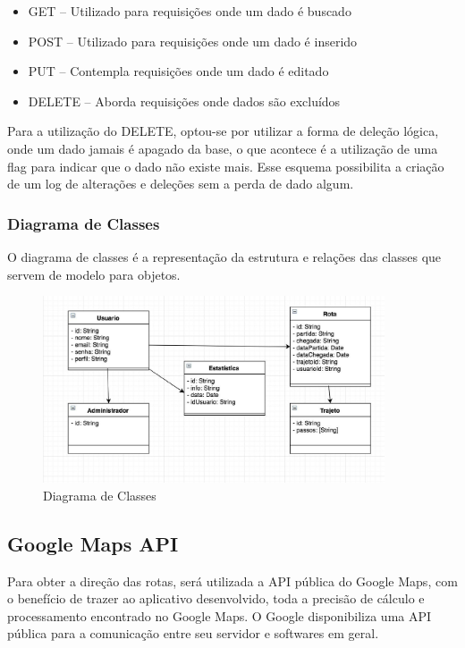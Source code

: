 \begin{itemize}
\item GET – Utilizado para requisições onde um dado é buscado
\item POST – Utilizado para requisições onde um dado é inserido
\item PUT – Contempla requisições onde um dado é editado
\item DELETE – Aborda requisições onde dados são excluídos

\end{itemize}
	
	Para a utilização do DELETE, optou-se por utilizar a forma de deleção lógica, onde um dado jamais é apagado da base, o que acontece é a utilização de uma flag para indicar que o dado não existe mais. Esse esquema possibilita a criação de um log de alterações e deleções sem a perda de dado algum.
	
\subsubsection{Diagrama de Classes}
O diagrama de classes é a representação da estrutura e relações das classes que servem de modelo para objetos.


\begin{figure}[!htb]
	\centering
	\includegraphics[width=0.9\textwidth]{arquitetura_bike.jpg}
	\caption{Diagrama de Classes}
	\label{img:diagramaclasse}
\end{figure}

\subsection{Google Maps API}
Para obter a direção das rotas, será utilizada a API pública do Google Maps, com o benefício de trazer ao aplicativo desenvolvido, toda a precisão de cálculo e processamento encontrado no Google Maps.
O Google disponibiliza uma API pública para a comunicação entre seu servidor e  softwares em geral.


